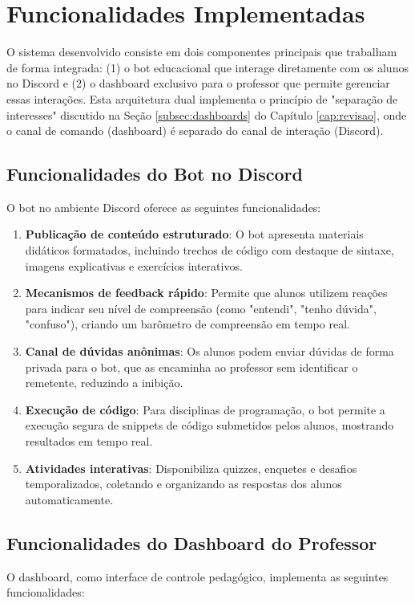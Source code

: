 
\section{Funcionalidades Implementadas}
\label{sec:funcionalidades}

O sistema desenvolvido consiste em dois componentes principais que trabalham de forma integrada: (1) o bot educacional que interage diretamente com os alunos no Discord e (2) o dashboard exclusivo para o professor que permite gerenciar essas interações. Esta arquitetura dual implementa o princípio de "separação de interesses" discutido na Seção \ref{subsec:dashboards} do Capítulo \ref{cap:revisao}, onde o canal de comando (dashboard) é separado do canal de interação (Discord).

\subsection{Funcionalidades do Bot no Discord}
O bot no ambiente Discord oferece as seguintes funcionalidades:

\begin{enumerate}
\item \textbf{Publicação de conteúdo estruturado}: O bot apresenta materiais didáticos formatados, incluindo trechos de código com destaque de sintaxe, imagens explicativas e exercícios interativos.
\item \textbf{Mecanismos de feedback rápido}: Permite que alunos utilizem reações para indicar seu nível de compreensão (como "entendi", "tenho dúvida", "confuso"), criando um barômetro de compreensão em tempo real.
\item \textbf{Canal de dúvidas anônimas}: Os alunos podem enviar dúvidas de forma privada para o bot, que as encaminha ao professor sem identificar o remetente, reduzindo a inibição.
\item \textbf{Execução de código}: Para disciplinas de programação, o bot permite a execução segura de snippets de código submetidos pelos alunos, mostrando resultados em tempo real.
\item \textbf{Atividades interativas}: Disponibiliza quizzes, enquetes e desafios temporalizados, coletando e organizando as respostas dos alunos automaticamente.
\end{enumerate}

\subsection{Funcionalidades do Dashboard do Professor}
O dashboard, como interface de controle pedagógico, implementa as seguintes funcionalidades:

